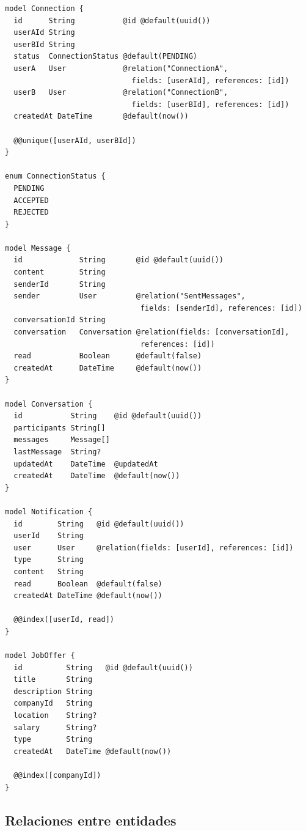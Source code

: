 \documentclass[a4paper]{report}
\begin{document}
\begin{lstlisting}[language=Prisma, caption={prisma/schema.prisma -- Modelo de datos completo}]
model Connection {
  id      String           @id @default(uuid())
  userAId String
  userBId String
  status  ConnectionStatus @default(PENDING)
  userA   User             @relation("ConnectionA",
                             fields: [userAId], references: [id])
  userB   User             @relation("ConnectionB",
                             fields: [userBId], references: [id])
  createdAt DateTime       @default(now())

  @@unique([userAId, userBId])
}

enum ConnectionStatus {
  PENDING
  ACCEPTED
  REJECTED
}

model Message {
  id             String       @id @default(uuid())
  content        String
  senderId       String
  sender         User         @relation("SentMessages",
                               fields: [senderId], references: [id])
  conversationId String
  conversation   Conversation @relation(fields: [conversationId],
                               references: [id])
  read           Boolean      @default(false)
  createdAt      DateTime     @default(now())
}

model Conversation {
  id           String    @id @default(uuid())
  participants String[]
  messages     Message[]
  lastMessage  String?
  updatedAt    DateTime  @updatedAt
  createdAt    DateTime  @default(now())
}

model Notification {
  id        String   @id @default(uuid())
  userId    String
  user      User     @relation(fields: [userId], references: [id])
  type      String
  content   String
  read      Boolean  @default(false)
  createdAt DateTime @default(now())

  @@index([userId, read])
}

model JobOffer {
  id          String   @id @default(uuid())
  title       String
  description String
  companyId   String
  location    String?
  salary      String?
  type        String
  createdAt   DateTime @default(now())

  @@index([companyId])
}
\end{lstlisting}

\subsection{Relaciones entre entidades}
\end{document}
